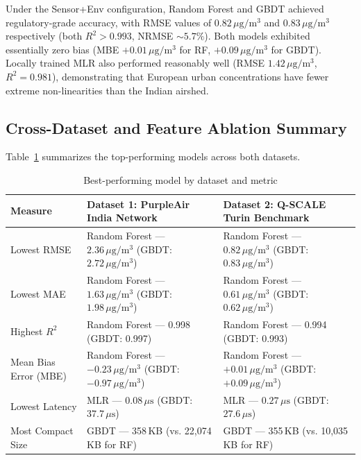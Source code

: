 \documentclass[11pt,a4paper]{article}
\begin{document}
Under the Sensor+Env configuration, Random Forest and GBDT achieved regulatory-grade accuracy, with RMSE values of $0.82\,\mu\text{g}/\text{m}^3$ and $0.83\,\mu\text{g}/\text{m}^3$ respectively (both $R^2 > 0.993$, NRMSE $\sim 5.7\%$). Both models exhibited essentially zero bias (MBE $+0.01\,\mu\text{g}/\text{m}^3$ for RF, $+0.09\,\mu\text{g}/\text{m}^3$ for GBDT). Locally trained MLR also performed reasonably well (RMSE $1.42\,\mu\text{g}/\text{m}^3$, $R^2 = 0.981$), demonstrating that European urban concentrations have fewer extreme non-linearities than the Indian airshed.

\subsection{Cross-Dataset and Feature Ablation Summary}
Table~\ref{tab:best_models} summarizes the top-performing models across both datasets.

\begin{table}[htbp]
\centering
\small
\caption{Best-performing model by dataset and metric}
\label{tab:best_models}
\begin{tabularx}{\textwidth}{l X X}
\toprule
\textbf{Measure} & \textbf{Dataset 1: PurpleAir India Network} & \textbf{Dataset 2: Q-SCALE Turin Benchmark} \\
\midrule
Lowest RMSE & Random Forest --- $2.36\,\mu\text{g}/\text{m}^3$ (GBDT: $2.72\,\mu\text{g}/\text{m}^3$) & Random Forest --- $0.82\,\mu\text{g}/\text{m}^3$ (GBDT: $0.83\,\mu\text{g}/\text{m}^3$) \\
Lowest MAE & Random Forest --- $1.63\,\mu\text{g}/\text{m}^3$ (GBDT: $1.98\,\mu\text{g}/\text{m}^3$) & Random Forest --- $0.61\,\mu\text{g}/\text{m}^3$ (GBDT: $0.62\,\mu\text{g}/\text{m}^3$) \\
Highest $R^2$ & Random Forest --- 0.998 (GBDT: 0.997) & Random Forest --- 0.994 (GBDT: 0.993) \\
Mean Bias Error (MBE) & Random Forest --- $-0.23\,\mu\text{g}/\text{m}^3$ (GBDT: $-0.97\,\mu\text{g}/\text{m}^3$) & Random Forest --- $+0.01\,\mu\text{g}/\text{m}^3$ (GBDT: $+0.09\,\mu\text{g}/\text{m}^3$) \\
Lowest Latency & MLR --- $0.08\,\mu\text{s}$ (GBDT: $37.7\,\mu\text{s}$) & MLR --- $0.27\,\mu\text{s}$ (GBDT: $27.6\,\mu\text{s}$) \\
Most Compact Size & GBDT --- 358\,KB (vs. 22,074\,KB for RF) & GBDT --- 355\,KB (vs. 10,035\,KB for RF) \\
\bottomrule
\end{tabularx}
\end{table}
\end{document}
